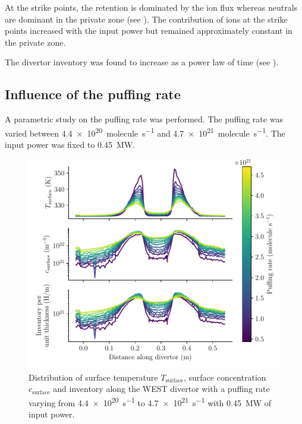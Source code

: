 At the strike points, the retention is dominated by the ion flux whereas neutrals are dominant in the private zone (see ).
The contribution of ions at the strike points increased with the input power but remained approximately constant in the private zone.

The divertor inventory was found to increase as a power law of time (see ).


\subsection{Influence of the puffing rate} 

A parametric study on the puffing rate was performed.
The puffing rate was varied between \SI{4.4e20}{molecule.s^{-1}} and \SI{4.7e21}{molecule.s^{-1}}.
The input power was fixed to \SI{0.45}{MW}.

\begin{figure}[h]
    \centering
    \includegraphics[width=\linewidth]{Figures/Chapter4/WEST/inventory_along_divertor.pdf}
    \caption{Distribution of surface temperature $T_\mathrm{surface}$, surface concentration $c_\mathrm{surface}$ and inventory along the WEST divertor with a puffing rate varying from \SI{4.4e20}{s^{-1}} to \SI{4.7e21}{s^{-1}} with \SI{0.45}{MW} of input power.}
\end{figure}

